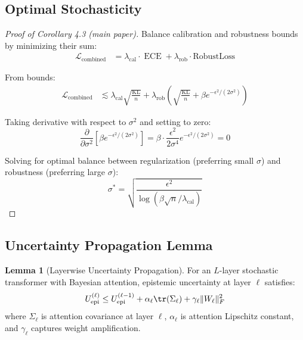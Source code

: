 \documentclass[12pt,a4paper]{article}
\theoremstyle{definition}
\newtheorem{lemma}[theorem]{Lemma}
\DeclareMathOperator{\ECE}{ECE}
\DeclareMathOperator{\KL}{KL}
\begin{document}
\subsection{Optimal Stochasticity}

\begin{proof}[Proof of Corollary 4.3 (main paper)]
Balance calibration and robustness bounds by minimizing their sum:
\begin{align}
\mathcal{L}_{\text{combined}} &= \lambda_{\text{cal}} \cdot \ECE + \lambda_{\text{rob}} \cdot \text{RobustLoss}
\end{align}

From bounds:
\begin{align}
\mathcal{L}_{\text{combined}} &\lesssim \lambda_{\text{cal}} \sqrt{\frac{\KL}{n}} + \lambda_{\text{rob}} \left(\sqrt{\frac{\KL}{n}} + \beta e^{-\epsilon^2/(2\sigma^2)}\right)
\end{align}

Taking derivative with respect to $\sigma^2$ and setting to zero:
\begin{equation}
\frac{\partial}{\partial \sigma^2}\left[\beta e^{-\epsilon^2/(2\sigma^2)}\right] = \beta \cdot \frac{\epsilon^2}{2\sigma^4} e^{-\epsilon^2/(2\sigma^2)} = 0
\end{equation}

Solving for optimal balance between regularization (preferring small $\sigma$) and robustness (preferring large $\sigma$):
\begin{equation}
\sigma^* = \sqrt{\frac{\epsilon^2}{\log(\beta\sqrt{n}/\lambda_{\text{cal}})}}
\end{equation}
\end{proof}

\subsection{Uncertainty Propagation Lemma}

\begin{lemma}[Layerwise Uncertainty Propagation]
\label{lem:uncertainty_propagation}
For an $L$-layer stochastic transformer with Bayesian attention, epistemic uncertainty at layer $\ell$ satisfies:
\begin{equation}
U_{\text{epi}}^{(\ell)} \leq U_{\text{epi}}^{(\ell-1)} + \alpha_\ell \tr(\Sigma_\ell) + \gamma_\ell \|W_\ell\|_F^2
\end{equation}
where $\Sigma_\ell$ is attention covariance at layer $\ell$, $\alpha_\ell$ is attention Lipschitz constant, and $\gamma_\ell$ captures weight amplification.
\end{lemma}
\end{document}
